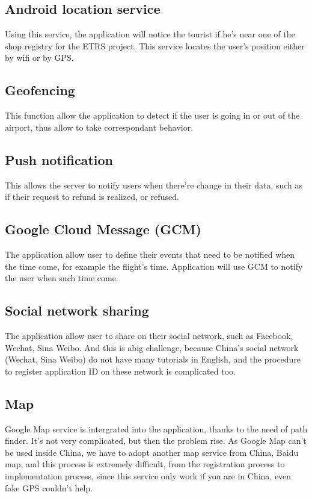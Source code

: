 \subsection{Android location service}
Using this service, the application will notice the tourist if he's near one of the shop registry for the ETRS project. This service locates the user's position either by wifi or by GPS.

\subsection{Geofencing}
This function allow the application to detect if the user is going in or out of the airport, thus allow to take correspondant behavior.

\subsection{Push notification}
This allows the server to notify users when there're change in their data, such as if their request to refund is realized, or refused. 

\subsection{Google Cloud Message (GCM)}
The application allow user to define their events that need to be notified when the time come, for example the flight's time. Application will use GCM to notify the user when such time come.

\subsection{Social network sharing}
The application allow user to share on their social network, such as Facebook, Wechat, Sina Weibo. And this is abig challenge, because China's social network (Wechat, Sina Weibo) do not have many tutorials in English, and the procedure to register application ID on these network is complicated too. 

\subsection{Map}
Google Map service is intergrated into the application, thanks to the need of path finder. It's not very complicated, but then the problem rise. As Google Map can't be used inside China, we have to adopt another map service from China, Baidu map, and this process is extremely difficult, from the registration process to implementation process, since this service only work if you are in China, even fake GPS couldn't help.


